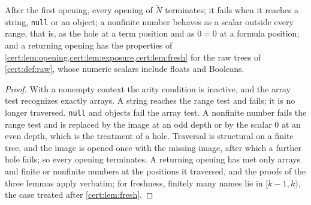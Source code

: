 \begin{lemma}\label{cert:lem:tolerant-open}
After the first opening, every opening of $\widetilde N$ terminates; it fails
when it reaches a string, \texttt{null} or an object; a nonfinite number behaves
as a scalar outside every range, that is, as the hole at a term position and as
$0=0$ at a formula position; and a returning opening has the properties of
\cref{cert:lem:opening,cert:lem:exposure,cert:lem:fresh} for the raw trees of
\cref{cert:def:raw}, whose numeric scalars include floats and Booleans.
\end{lemma}
\begin{proof}
With a nonempty context the arity condition is inactive, and the array test
recognizes exactly arrays. A string reaches the range test and fails; it is no
longer traversed. \texttt{null} and objects fail the array test. A nonfinite
number fails the range test and is replaced by the image at an odd depth or by
the scalar $0$ at an even depth, which is the treatment of a hole. Traversal is
structural on a finite tree, and the image is opened once with the missing image,
after which a further hole fails; so every opening terminates. A returning
opening has met only arrays and finite or nonfinite numbers at the positions it
traversed, and the proofs of the three lemmas apply verbatim; for freshness,
finitely many names lie in $[k-1,k)$, the case treated after
\cref{cert:lem:fresh}.
\end{proof}

